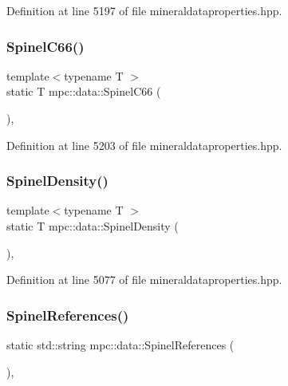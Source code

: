 Definition at line 5197 of file mineraldataproperties.\+hpp.

\mbox{\label{namespacempc_1_1data_afd4bcae5d47ca7616f5b24d47a0fbe58}} 
\subsubsection{\texorpdfstring{Spinel\+C66()}{SpinelC66()}}
{\footnotesize\ttfamily template$<$typename T $>$ \\
static T mpc\+::data\+::\+Spinel\+C66 (\begin{DoxyParamCaption}{ }\end{DoxyParamCaption})\hspace{0.3cm}{\ttfamily [inline]}, {\ttfamily [static]}}



Definition at line 5203 of file mineraldataproperties.\+hpp.

\mbox{\label{namespacempc_1_1data_a01c1437a39fe7e85a683cded4e66444c}} 
\subsubsection{\texorpdfstring{Spinel\+Density()}{SpinelDensity()}}
{\footnotesize\ttfamily template$<$typename T $>$ \\
static T mpc\+::data\+::\+Spinel\+Density (\begin{DoxyParamCaption}{ }\end{DoxyParamCaption})\hspace{0.3cm}{\ttfamily [inline]}, {\ttfamily [static]}}



Definition at line 5077 of file mineraldataproperties.\+hpp.

\mbox{\label{namespacempc_1_1data_a61810e8bf3f43392340d3c346f7a9298}} 
\subsubsection{\texorpdfstring{Spinel\+References()}{SpinelReferences()}}
{\footnotesize\ttfamily static std\+::string mpc\+::data\+::\+Spinel\+References (\begin{DoxyParamCaption}{ }\end{DoxyParamCaption})\hspace{0.3cm}{\ttfamily [inline]}, {\ttfamily [static]}}



